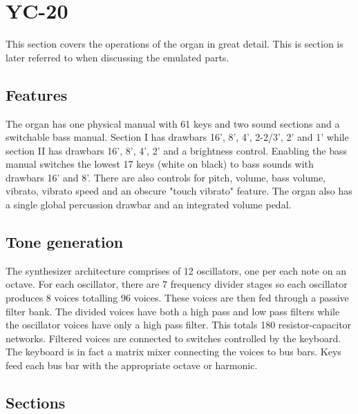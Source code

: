 \documentclass[11pt,a4paper]{article}
\begin{document}


\section{YC-20}
\label{section:yc-20}

This section covers the operations of the organ in great detail. This is section is later referred to when discussing the emulated parts.

\subsection{Features}

The organ has one physical manual with 61 keys and two sound sections and a switchable bass manual. Section I has drawbars 16', 8', 4', 2-2/3', 2' and 1' while section II has drawbars 16', 8', 4', 2' and a brightness control. Enabling the bass manual switches the lowest 17 keys (white on black) to bass sounds with drawbars 16' and 8'. There are also controls for pitch, volume, bass volume, vibrato, vibrato speed and an obscure "touch vibrato" feature. The organ also has a single global percussion drawbar and an integrated volume pedal.

\subsection{Tone generation}

The synthesizer architecture comprises of 12 oscillators, one per each note on an octave. For each oscillator, there are 7 frequency divider stages so each oscillator produces 8 voices totalling 96 voices. These voices are then fed through a passive filter bank. The divided voices have both a high pass and low pass filters while the oscillator voices have only a high pass filter. This totals 180 resistor-capacitor networks. Filtered voices are connected to switches controlled by the keyboard. The keyboard is in fact a matrix mixer connecting the voices to bus bars. Keys feed each bus bar with the appropriate octave or harmonic.

\subsection{Sections}
\end{document}
